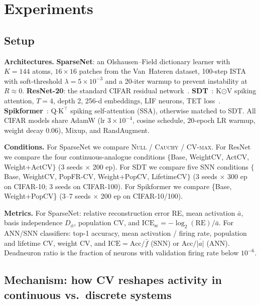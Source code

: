 \documentclass{article}
\begin{document}
\section{Experiments}
\label{sec:experiments}

\subsection{Setup}
\label{sec:setup}

\textbf{Architectures.} \textbf{SparseNet}: an Olshausen--Field dictionary learner with $K{=}144$ atoms, $16{\times}16$ patches from the Van~Hateren dataset, 100-step ISTA with soft-threshold $\lambda{=}5{\times}10^{-3}$ and a 20-iter warmup to prevent instability at $R{\approx}0$. \textbf{ResNet-20}: the standard CIFAR residual network~\cite{he2016deep}. \textbf{SDT}~\cite{yao2023sdt}: K$\odot$V spiking attention, $T{=}4$, depth 2, 256-d embeddings, LIF neurons, TET loss~\cite{deng2022tet}. \textbf{Spikformer}~\cite{zhou2023spikformer}: Q$\cdot$K$^\top$ spiking self-attention (SSA), otherwise matched to SDT. All CIFAR models share AdamW (lr $3{\times}10^{-4}$, cosine schedule, 20-epoch LR warmup, weight decay 0.06), Mixup, and RandAugment.

\textbf{Conditions.} For SparseNet we compare \textsc{Null} / \textsc{Cauchy} / \textsc{CV-max}. For ResNet we compare the four continuous-analogue conditions $\{$Base, WeightCV, ActCV, Weight+ActCV$\}$ (3 seeds $\times$ 200 ep). For SDT we compare five SNN conditions $\{$Base, WeightCV, PopFR-CV, Weight+PopCV, LifetimeCV$\}$ (3 seeds $\times$ 300 ep on CIFAR-10; 3 seeds on CIFAR-100). For Spikformer we compare \{Base, Weight+PopCV\} (3--7 seeds $\times$ 200 ep on CIFAR-10/100).

\textbf{Metrics.} For SparseNet: relative reconstruction error RE, mean activation $\bar{a}$, basis independence $D_\phi$, population CV, and $\mathrm{ICE}_{\text{sc}}{=}-\log_2(\mathrm{RE})/\bar{a}$. For ANN/SNN classifiers: top-1 accuracy, mean activation / firing rate, population and lifetime CV, weight CV, and $\mathrm{ICE}{=}\text{Acc}/\bar{f}$ (SNN) or $\text{Acc}/\overline{|a|}$ (ANN). Deadneuron ratio is the fraction of neurons with validation firing rate below $10^{-6}$.

\subsection{Mechanism: how CV reshapes activity in continuous vs.\ discrete systems}
\label{sec:res-mechanism}
\end{document}
